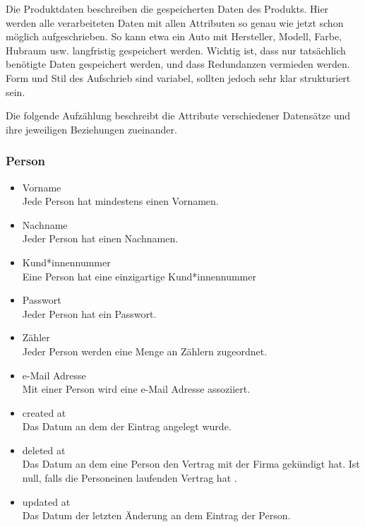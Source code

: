 \begin{tcolorbox}
Die Produktdaten beschreiben die gespeicherten Daten des Produkts. 
Hier werden alle verarbeiteten Daten mit allen Attributen so genau wie jetzt schon möglich aufgeschrieben.
So kann etwa ein Auto mit Hersteller, Modell, Farbe, Hubraum usw. langfristig gespeichert werden.
Wichtig ist, dass nur tatsächlich benötigte Daten gespeichert werden, und dass Redundanzen vermieden werden.
Form und Stil des Aufschrieb sind variabel, sollten jedoch sehr klar strukturiert sein.
\end{tcolorbox}
Die folgende Aufzählung beschreibt die Attribute verschiedener Datensätze und ihre jeweiligen Beziehungen zueinander.

\subsubsection*{Person}
	\begin{itemize}
  		\item Vorname \hfill \\
  		Jede Person hat mindestens einen Vornamen.
 		\item Nachname\hfill \\
 		Jeder Person hat einen Nachnamen.
 		\item Kund*innennummer\hfill \\
 		Eine Person hat eine einzigartige Kund*innennummer
 		\item Passwort \hfill \\
 		Jeder Person hat ein Passwort.
		\item Zähler\hfill \\
		Jeder Person werden eine Menge an Zählern zugeordnet.
		\item e-Mail Adresse\hfill \\
		Mit einer Person wird eine e-Mail Adresse assoziiert.
		\item created at\hfill \\
		Das Datum an dem der Eintrag angelegt wurde.
		\item deleted at\hfill \\
		Das Datum an dem eine Person den Vertrag mit der Firma gekündigt hat. Ist null, falls die Personeinen laufenden Vertrag hat .
		\item updated at\hfill \\
		Das Datum der letzten Änderung an dem Eintrag der Person.
	\end{itemize}
